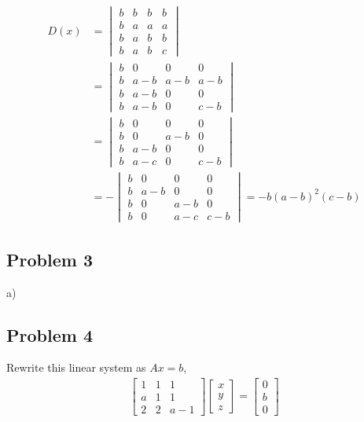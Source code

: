 \documentclass[letterpaper, 11pt]{article}
\newcommand{\1}{\mathds{1}}	%
\theoremstyle{definition}
\begin{document}
\begin{align*}
    D(x) &= \begin{vmatrix}
        b & b & b & b \\
        b & a & a & a \\
        b & a & b & b \\
        b & a & b & c
    \end{vmatrix} \\ & =\begin{vmatrix}
        b & 0 & 0 & 0 \\
        b & a -b & a-b & a-b \\
        b & a-b & 0 & 0 \\
        b & a-b & 0 & c-b
    \end{vmatrix} \\& =\begin{vmatrix}
        b & 0 & 0 & 0 \\
        b & 0 & a-b & 0 \\
        b & a-b & 0 & 0 \\
        b & a-c & 0 & c-b
    \end{vmatrix} \\& = - \begin{vmatrix}
        b & 0 & 0 & 0 \\
        b & a -b & 0 & 0 \\
        b & 0 & a-b & 0 \\
        b & 0 & a-c & c-b
    \end{vmatrix} = -b(a-b)^{2}(c-b)
\end{align*}

\subsection*{Problem 3}


a)

\subsection*{Problem 4}

Rewrite this linear system as $Ax=b$, \begin{align*}
    \begin{bmatrix}
        1 & 1 & 1 \\
        a & 1 & 1 \\
        2 & 2 & a-1 
    \end{bmatrix} \begin{bmatrix}
        x \\ y \\ z 
    \end{bmatrix} = \begin{bmatrix}
        0 \\ b \\ 0
    \end{bmatrix}
\end{align*}
\end{document}
